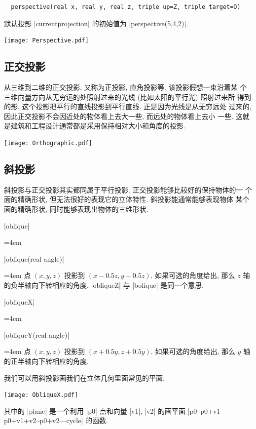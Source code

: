 \documentclass[nofonts,CJKnormalspaces]{ctexbook}
\newenvironment{funclist}{\trivlist
  \parindent=0pt
\item[]
  \def\item{\medskip\par\leftskip=0pt}
  \def\go{\par\leftskip=4em}}
{\endtrivlist}
\begin{document}
\begin{lstlisting}
  perspective(real x, real y, real z, triple up=Z, triple target=O)
\end{lstlisting}
默认投影 |currentprojection| 的初始值为 |perspective(5,4,2)|.

\begin{center}\texttt{[image: Perspective.pdf]}\end{center}%



\subsection{正交投影}
从三维到二维的正交投影, 又称为正投影, 直角投影等. 该投影假想一束沿着某
个三维向量方向从无穷远的处照射过来的光线 (比如太阳的平行光) 照射过来所
得到的影. 这个投影把平行的直线投影到平行直线. 正是因为光线是从无穷远处
过来的, 因此正交投影不会因近处的物体看上去大一些, 而远处的物体看上去小
一些. 这就是建筑和工程设计通常都是采用保持相对大小和角度的投影.
\begin{center}\texttt{[image: Orthographic.pdf]}\end{center}%


\subsection{斜投影}
斜投影与正交投影其实都同属于平行投影. 正交投影能够比较好的保持物体的一
个面的精确形状, 但无法很好的表现它的立体特性. 斜投影能通常能够表现物体
某个面的精确形状, 同时能够表现出物体的三维形状.
\begin{funclist}
\item |oblique| \go
\item |oblique(real angle)| \go
  点 $(x,y,z)$ 投影到 $(x-0.5z,y-0.5z)$. 如果可选的角度给出, 那么 $z$ 轴
  的负半轴向下转相应的角度. |obliqueZ| 与 |bolique| 是同一个意思.
\item |obliqueX| \go
\item |obliqueY(real angle)| \go
  点 $(x,y,z)$ 投影到 $(x+0.5y,z+0.5y)$. 如果可选的角度给出, 那么 $y$ 轴
  的正半轴向下转相应的角度.
\end{funclist}

我们可以用斜投影画我们在立体几何里面常见的平面.
\begin{center}\texttt{[image: ObliqueX.pdf]}\end{center}%


其中的 |plane| 是一个利用 |p0| 点和向量 |v1|, |v2| 的画平面
|p0--p0+v1--p0+v1+v2--p0+v2---cycle| 的函数.
\end{document}

